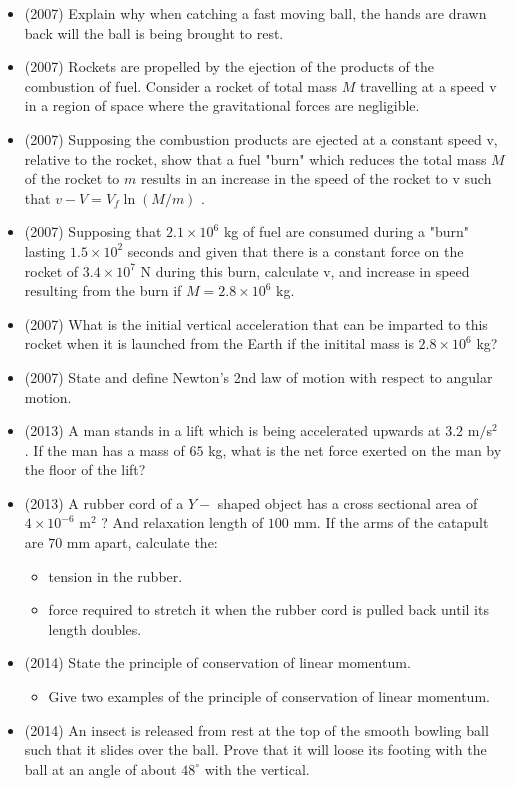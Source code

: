 \documentclass{article}
\begin{document}
\begin{itemize}
\item (2007)  Explain why when catching a fast moving ball, the hands are drawn back will the ball is being brought to rest.
\item (2007)  Rockets are propelled by the ejection of the products of the combustion of fuel.  Consider a rocket of total mass $ M$ travelling at a speed v in a region of space where the gravitational forces are negligible.  
\item (2007)  Supposing the combustion products are ejected at a constant speed v, relative to the rocket, show that a fuel "burn" which reduces the total mass $ M$ of the rocket to $ m$ results in an increase in the speed of the rocket to v such that $ v-V=V_{f} \ln (M/m)$ .
\item (2007)  Supposing that $ 2.1\times10^{6}$ kg of fuel are consumed during a "burn" lasting $ 1.5\times10^{2}$ seconds and given that there is a constant force on the rocket of $ 3.4\times 10^{7}$ N during this burn, calculate v, and increase in speed resulting from the burn if $ M=2.8\times10^{6}$ kg.  
\item (2007)  What is the initial vertical acceleration that can be imparted to this rocket when it is launched from the Earth if the initital mass is $ 2.8\times 10^{6}$ kg?
\item (2007)  State and define Newton’s 2nd law of motion with respect to angular motion. 
\item (2013)  A man stands in a lift which is being accelerated upwards at $ 3.2$ m$/$s$ ^{2}$ . If the man has a mass of $ 65$ kg, what is the net force exerted on the man by the floor of the lift?
\item (2013)  A rubber cord of a $ Y-$ shaped object has a cross sectional area of $ 4 \times 10^{-6}$ m$ ^{2}$ ? And relaxation length of $ 100$ mm. If the arms of the catapult are $ 70$ mm apart, calculate the: 
 \begin{itemize}
\item tension in the rubber. 
\item force required to stretch it when the rubber cord is pulled back until its length doubles. 
\end{itemize}
\item (2014)  State the principle of conservation of linear momentum. 
 \begin{itemize}
\item Give two examples of the principle of conservation of linear momentum. 
\end{itemize}
\item (2014)  An insect is released from rest at the top of the smooth bowling ball such that it slides over the ball. Prove that it will loose its footing with the ball at an angle of about $ 48^{\circ}$ with the vertical.

\end{itemize}
\end{document}
